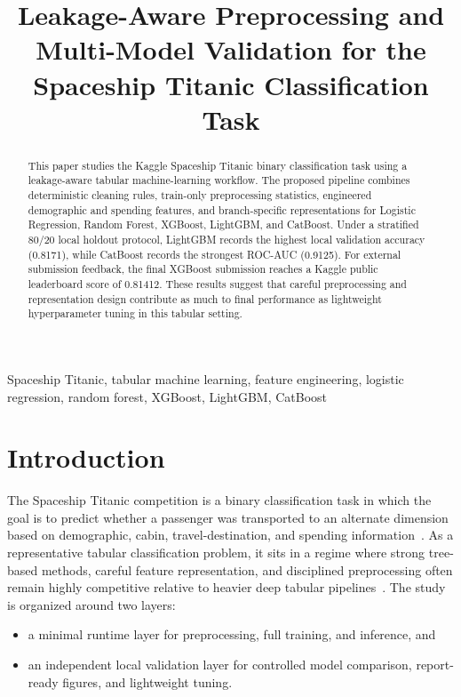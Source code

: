 \documentclass[conference]{IEEEtran}
\title{Leakage-Aware Preprocessing and Multi-Model Validation for the Spaceship Titanic Classification Task}
\author{
\IEEEauthorblockN{
Wang Han 2430034066 \quad Shen Yijie 2430034056 \quad Yang Yusong 2430034087\\
Jiang Zhibo 2430034031 \quad He Yuxiang 2230024062
}
\IEEEauthorblockA{group3}
}
\begin{document}
\maketitle

\begin{abstract}
This paper studies the Kaggle Spaceship Titanic binary classification task using a leakage-aware tabular machine-learning workflow. The proposed pipeline combines deterministic cleaning rules, train-only preprocessing statistics, engineered demographic and spending features, and branch-specific representations for Logistic Regression, Random Forest, XGBoost, LightGBM, and CatBoost. Under a stratified 80/20 local holdout protocol, LightGBM records the highest local validation accuracy (0.8171), while CatBoost records the strongest ROC-AUC (0.9125). For external submission feedback, the final XGBoost submission reaches a Kaggle public leaderboard score of 0.81412. These results suggest that careful preprocessing and representation design contribute as much to final performance as lightweight hyperparameter tuning in this tabular setting.
\end{abstract}

\begin{IEEEkeywords}
Spaceship Titanic, tabular machine learning, feature engineering, logistic regression, random forest, XGBoost, LightGBM, CatBoost
\end{IEEEkeywords}

\section{Introduction}
The Spaceship Titanic competition is a binary classification task in which the goal is to predict whether a passenger was transported to an alternate dimension based on demographic, cabin, travel-destination, and spending information~\cite{kaggle_spaceship_titanic}. As a representative tabular classification problem, it sits in a regime where strong tree-based methods, careful feature representation, and disciplined preprocessing often remain highly competitive relative to heavier deep tabular pipelines~\cite{borisov2024tabularsurvey,grinsztajn2022trees,mcelfresh2023nnsvstrees,grinsztajn2024betterdefault,tschalzev2024datacentric}. The study is organized around two layers:
\begin{itemize}
\item a minimal runtime layer for preprocessing, full training, and inference, and
\item an independent local validation layer for controlled model comparison, report-ready figures, and lightweight tuning.
\end{itemize}
\end{document}
